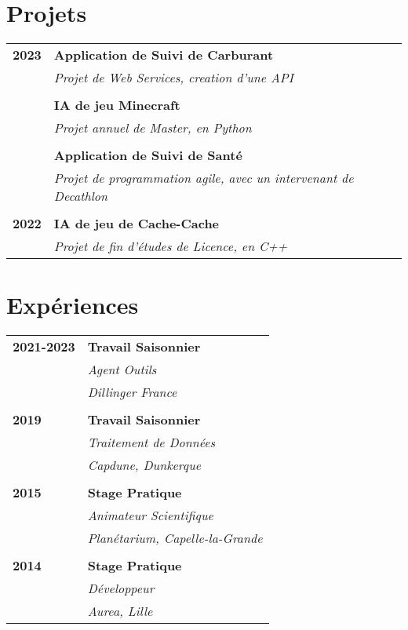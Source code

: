 \documentclass[a4paper, 12pt]{article}
\begin{document}
\begin{minipage}[t]{0.65\textwidth}
    \vspace{-0.4cm}

    \section*{\textcolor{sectioncolor}{Projets}}
    \begin{tabular}{ m{} m{} }
        \textbf{2023} & \textbf{Application de Suivi de Carburant} \\
        & \textit{Projet de Web Services, creation d'une API} \\
        & \\
        & \textbf{IA de jeu Minecraft} \\
        & \textit{Projet annuel de Master, en Python} \\
        & \\
        & \textbf{Application de Suivi de Santé} \\
        & \textit{Projet de programmation agile, avec un intervenant de Decathlon} \\
        & \\
        \textbf{2022} & \textbf{IA de jeu de Cache-Cache} \\
        & \textit{Projet de fin d'études de Licence, en C++} \\
    \end{tabular}

    \vspace{-0.4cm}

    \section*{\textcolor{sectioncolor}{Expériences}}
    \begin{tabular}{ m{} m{} }
        \textbf{2021-2023} & \textbf{Travail Saisonnier} \\
        & \textit{Agent Outils} \\
        & \textit{Dillinger France} \\
        & \\
        \textbf{2019} & \textbf{Travail Saisonnier} \\
        & \textit{Traitement de Données} \\
        & \textit{Capdune, Dunkerque} \\
        & \\
        \textbf{2015} & \textbf{Stage Pratique} \\
        & \textit{Animateur Scientifique} \\
        & \textit{Planétarium, Capelle-la-Grande} \\
        & \\
        \textbf{2014} & \textbf{Stage Pratique} \\
        & \textit{Développeur} \\
        & \textit{Aurea, Lille} \\
    \end{tabular}

\end{minipage}
\end{document}
